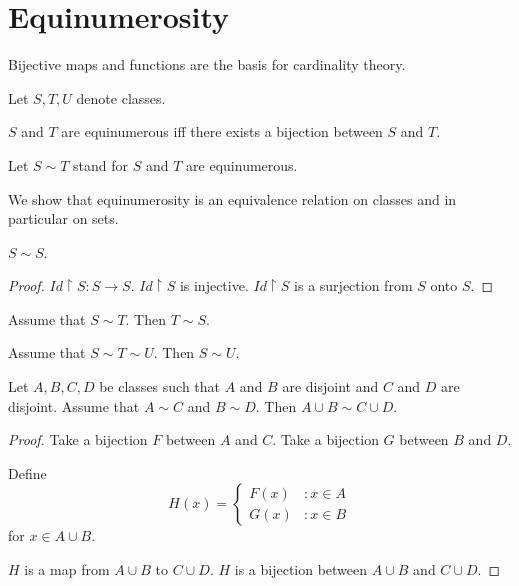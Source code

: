 \documentclass{article}
\begin{document}
\section{Equinumerosity}
%
Bijective maps and functions are the basis for cardinality
theory.
%
\begin{forthel}
Let $S, T, U$ denote classes.

\begin{definition}
$S$ and $T$ are equinumerous iff there exists a bijection between $S$ and
$T$.
\end{definition}

Let $S \sim T$ stand for $S$ and $T$ are equinumerous.
\end{forthel}
%
We show that equinumerosity is an equivalence relation on classes and
in particular on sets.
%
\begin{forthel}

\begin{lemma}
$S \sim S$.
\end{lemma}
\begin{proof}
$Id \upharpoonright S : S \rightarrow S$.
$Id \upharpoonright S$ is injective.
$Id \upharpoonright S$ is a surjection from $S$ onto $S$.
\end{proof}

\begin{lemma}
Assume that $S \sim T$. Then $T \sim S$.
\end{lemma}

\begin{lemma}
Assume that $S \sim T \sim U$. Then $S \sim U$.
\end{lemma}

\begin{lemma}
Let $A,B,C,D$ be classes such that $A$ and $B$ are disjoint and
$C$ and $D$ are disjoint. Assume that $A \sim C$ and $B \sim D$.
Then $A \cup B \sim C \cup D$.
\end{lemma}
\begin{proof}
Take a bijection $F$ between $A$ and $C$.
Take a bijection $G$ between $B$ and $D$.

Define \[ H(x) =
          \begin{cases}
            F(x) & : x \in A \\
            G(x) & : x \in B
          \end{cases} \]
        for $x \in A \cup B$.

$H$ is a map from $A \cup B$ to $C \cup D$.
$H$ is a bijection between $A \cup B$ and $C \cup D$.
\end{proof}

\end{forthel}
\end{document}
